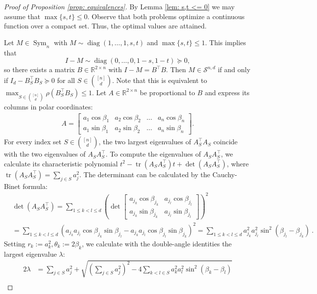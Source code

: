 \documentclass[10pt,a4paper]{amsart}
\def\RR{\mathbb{R}}
\def\S{\mathcal{S}}
\def\Sym{\operatorname{Sym}}
\def\b{\beta}
\def\diag{\operatorname{diag}}
\def\tr{\operatorname{tr}}
\begin{document}
\begin{proof}[Proof of Proposition \ref{prop: equivalences}]
By Lemma \ref{lem: s,t <= 0} we may assume that $\max \{s,t\} \leq 0$.
Observe that both problems optimize a continuous function over a compact set. Thus, the optimal values are attained.

Let $M \in \Sym_n$ with $M \sim \diag (1,\ldots,1,s,t)$ and $\max\{s,t\} \leq 1$. This implies that 
\[
I-M \sim \diag(0,\ldots,0,1-s,1-t) \succeq 0,
\]
so there exists a matrix $B \in \RR^{2 \times n}$ with $I-M=B^\top B$. Then $M \in \S^{n,d}$ if and only if $I_d-B_S^\top B_S \succeq 0$ for all $S \in \binom{[n]}{d}$. Note that this is equivalent to $\max_{S \in \binom{[n]}{d}} \rho(B_S^\top B_S) \leq 1$.
Let $A \in \RR^{2 \times n}$ be proportional to $B$ and express its columns in polar coordinates: 
\begin{align}\label{eq: matrix A}
A=\begin{bmatrix}
a_1\cos\b_1 & a_2\cos\b_2 & \dots & a_n\cos\b_n\\
a_1\sin\b_1 & a_2\sin\b_2 & \dots & a_n\sin\b_n
\end{bmatrix}.
\end{align}
For every index set $S \in \binom{[n]}{d}$, the two largest eigenvalues of $A_S^\top A_S$ coincide with the two eigenvalues of $A_SA_S^\top$. 
To compute the eigenvalues of $A_SA_S^\top$, we calculate its characteristic polynomial $t^2-\tr(A_SA_S^\top)t+\det(A_SA_S^\top)$, where $\tr(A_SA_S^\top)=\sum_{j \in S}a_j^2$. The determinant can be calculated by the Cauchy-Binet formula:
\begin{align*}
&\det(A_SA_S^\top) = \sum_{1 \leq k < l \leq d} \left(\det\begin{bmatrix}
    a_{j_k} \cos\beta_{j_k} & a_{j_l} \cos\beta_{j_l} \\ a_{j_k} \sin\beta_{j_k} & a_{j_l} \sin\beta_{j_l}
\end{bmatrix} \right)^2 \\ 
&= \sum_{1 \leq k < l \leq d}\left( a_{j_k}a_{j_l}\cos\beta_{j_k}\sin\beta_{j_l}-a_{j_k}a_{j_l}\cos\beta_{j_l}\sin\beta_{j_k}\right)^2 =\sum_{1 \leq k < l \leq d} a_{j_k}^2a_{j_l}^2\sin^2(\beta_{j_l}-\beta_{j_k})~.    
\end{align*} 
Setting $r_k:=a_k^2, \theta_k:=2\b_k$, we calculate with the double-angle identities the largest eigenvalue $\lambda$:
\begin{align*}
    2\lambda&=\sum_{j \in S} a_j^2+\sqrt{\left(\sum_{j \in S} a_j^2\right)^2-4\sum_{k<l \in S}a_k^2a_l^2\sin^2(\b_k-\b_l)}\\

\end{align*}
\end{proof}
\end{document}
